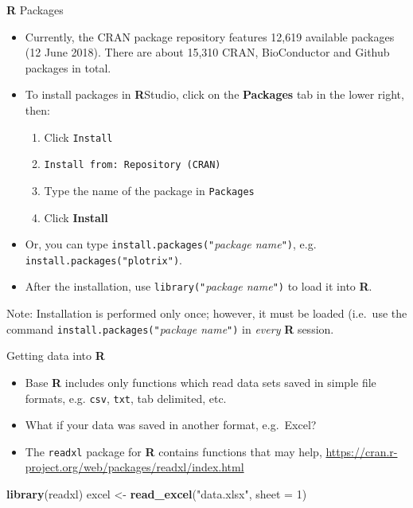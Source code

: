 \documentclass[ignorenonframetext,]{beamer}
\newenvironment{Shaded}{\begin{snugshade}}{\end{snugshade}}
\newcommand{\KeywordTok}[1]{\textcolor[rgb]{0.13,0.29,0.53}{\textbf{#1}}}
\newcommand{\DataTypeTok}[1]{\textcolor[rgb]{0.13,0.29,0.53}{#1}}
\newcommand{\DecValTok}[1]{\textcolor[rgb]{0.00,0.00,0.81}{#1}}
\newcommand{\StringTok}[1]{\textcolor[rgb]{0.31,0.60,0.02}{#1}}
\newcommand{\NormalTok}[1]{#1}
\providecommand{\tightlist}{%
  \setlength{\itemsep}{0pt}\setlength{\parskip}{0pt}}
\let\oldShaded\Shaded
\let\endoldShaded\endShaded
\renewenvironment{Shaded}{\footnotesize\oldShaded}{\endoldShaded}
\begin{document}
\begin{frame}[fragile]{\textbf{R} Packages}

\begin{itemize}
\item
  Currently, the CRAN package repository features 12,619 available
  packages (12 June 2018). There are about 15,310 CRAN, BioConductor and
  Github packages in total.
\item
  To install packages in \textbf{R}Studio, click on the
  \textbf{Packages} tab in the lower right, then:

  \begin{enumerate}
  \def\labelenumi{\arabic{enumi}.}
  \tightlist
  \item
    Click \texttt{Install}
  \item
    \texttt{Install\ from:\ Repository\ (CRAN)}
  \item
    Type the name of the package in \texttt{Packages}
  \item
    Click \textbf{Install}
  \end{enumerate}
\item
  Or, you can type \texttt{install.packages("}\emph{package
  name}\texttt{")}, e.g. \texttt{install.packages("plotrix")}.
\item
  After the installation, use \texttt{library("}\emph{package
  name}\texttt{")} to load it into \textbf{R}.
\end{itemize}

Note: Installation is performed only once; however, it must be loaded
(i.e.~use the command \texttt{install.packages("}\emph{package
name}\texttt{")} in \emph{every} \textbf{R} session.

\end{frame}

\begin{frame}[fragile]{Getting data into \textbf{R}}

\begin{itemize}
\tightlist
\item
  Base \textbf{R} includes only functions which read data sets saved in
  simple file formats, e.g. \texttt{csv}, \texttt{txt}, tab delimited,
  etc.
\item
  What if your data was saved in another format, e.g.~Excel?
\item
  The \texttt{readxl} package for \textbf{R} contains functions that may
  help, \url{https://cran.r-project.org/web/packages/readxl/index.html}
\end{itemize}

\begin{Shaded}
\begin{Highlighting}[]
\KeywordTok{library}\NormalTok{(readxl)}
\NormalTok{excel <-}\StringTok{ }\KeywordTok{read_excel}\NormalTok{(}\StringTok{"data.xlsx"}\NormalTok{, }\DataTypeTok{sheet =} \DecValTok{1}\NormalTok{)}
\end{Highlighting}
\end{Shaded}

\end{frame}
\end{document}
